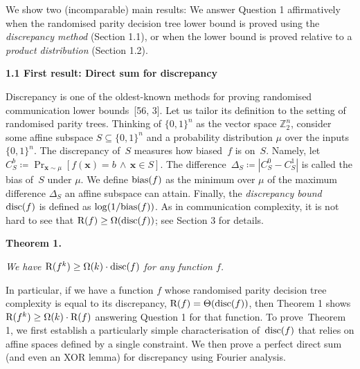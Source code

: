 


We show two (incomparable) main results: We answer Question 1 affirmatively when the randomised parity decision tree lower bound is proved using the \emph{discrepancy method} (Section 1.1), or when the lower bound is proved relative to a \emph{product distribution} (Section 1.2).\par





\par\medskip\noindent\textbf{
1.1 First result: Direct sum for discrepancy}\par




Discrepancy is one of the oldest-known methods for proving randomised communication lower bounds [56, 3]. Let us tailor its definition to the setting of randomised parity trees. Thinking of $\{0,1\}^{n}$ as the vector space $\mathbb{Z}_{2}^{n}$, consider some affine subspace $S\subseteq\{0,1\}^{n}$ and a probability distribution $\mu$ over the inputs $\{0,1\}^{n}$. The discrepancy of $S$ measures how biased $f$ is on $S$. Namely, let $C^{b}_{S}\coloneqq\Pr_{\bm{x}\sim\mu}[f(\bm{x})=b\,\wedge\,\bm{x}\in S]$. The difference $\Delta_{S}\coloneqq|C^{0}_{S}-C^{1}_{S}|$ is called the bias of $S$ under $\mu$. We define ${\textup{bias}}(f)$ as the minimum over $\mu$ of the maximum difference $\Delta_{S}$ an affine subspace can attain. Finally, the \emph{discrepancy bound} ${\textup{disc}}(f)$ is defined as $\log(1/{\textup{bias}}(f))$. As in communication complexity, it is not hard to see that ${\textup{R}}(f)\geq\Omega({\textup{disc}}(f))$; see Section 3 for details.\par





\par\medskip\noindent\textbf{
\textbf{Theorem 1}\textbf{.}
}\par



\emph{We have ${\textup{R}}(f^{k})\geq\Omega(k)\cdot{\textup{disc}}(f)$ for any function $f$.}\par






In particular, if we have a function $f$ whose randomised parity decision tree complexity is equal to its discrepancy, ${\textup{R}}(f)=\Theta({\textup{disc}}(f))$, then Theorem 1 shows ${\textup{R}}(f^{k})\geq\Omega(k)\cdot{\textup{R}}(f)$ answering Question 1 for that function. To prove Theorem 1, we first establish a particularly simple characterisation of ${\textup{disc}}(f)$ that relies on affine spaces defined by a single constraint. We then prove a perfect direct sum (and even an XOR lemma) for discrepancy using Fourier analysis.\par





